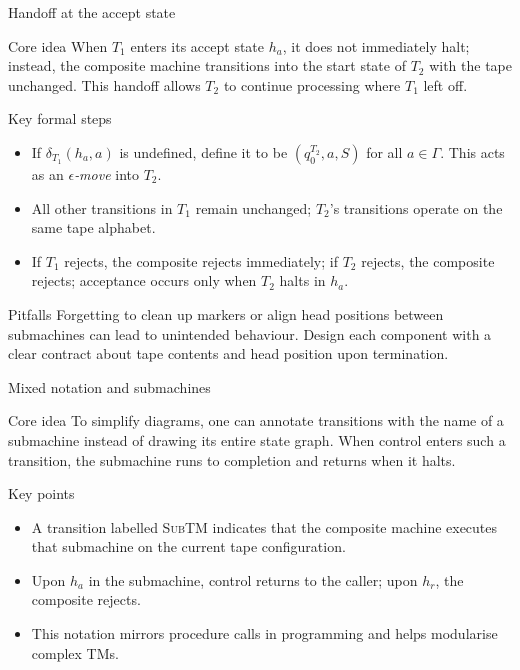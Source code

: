 \begin{frame}[t]{Handoff at the accept state}
  \begin{tblock}{Core idea}
    When $T_1$ enters its accept state $h_a$, it does not immediately
    halt; instead, the composite machine transitions into the start
    state of $T_2$ with the tape unchanged.  This handoff allows
    $T_2$ to continue processing where $T_1$ left off.
  \end{tblock}
  \begin{tblock}{Key formal steps}
    \begin{itemize}
      \item If $\delta_{T_1}(h_a,a)$ is undefined, define it to be
        $(q_0^{T_2},a,S)$ for all $a\in\Gamma$.  This acts as an
        \emph{$\epsilon$‑move} into $T_2$.
      \item All other transitions in $T_1$ remain unchanged; $T_2$’s
        transitions operate on the same tape alphabet.
      \item If $T_1$ rejects, the composite rejects immediately; if
        $T_2$ rejects, the composite rejects; acceptance occurs only
        when $T_2$ halts in $h_a$.
    \end{itemize}
  \end{tblock}
  \begin{talert}{Pitfalls}
    Forgetting to clean up markers or align head positions between
    submachines can lead to unintended behaviour.  Design each
    component with a clear contract about tape contents and head
    position upon termination.
  \end{talert}
  \label{fr:7.4-02}
\end{frame}

\begin{frame}[t]{Mixed notation and submachines}
  \begin{tblock}{Core idea}
    To simplify diagrams, one can annotate transitions with the name of
    a submachine instead of drawing its entire state graph.  When
    control enters such a transition, the submachine runs to completion
    and returns when it halts.
  \end{tblock}
  \begin{tblock}{Key points}
    \begin{itemize}
      \item A transition labelled \textsc{SubTM} indicates that the
        composite machine executes that submachine on the current tape
        configuration.
      \item Upon $h_a$ in the submachine, control returns to the
        caller; upon $h_r$, the composite rejects.
      \item This notation mirrors procedure calls in programming and
        helps modularise complex TMs.
    \end{itemize}
  \end{tblock}
  \label{fr:7.4-03}
\end{frame}

